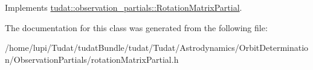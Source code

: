 Implements \hyperlink{classtudat_1_1observation__partials_1_1RotationMatrixPartial_a758db711ec18f3efbaa759488e45daf1}{tudat\+::observation\+\_\+partials\+::\+Rotation\+Matrix\+Partial}.



The documentation for this class was generated from the following file\+:\begin{DoxyCompactItemize}
\item 
/home/lupi/\+Tudat/tudat\+Bundle/tudat/\+Tudat/\+Astrodynamics/\+Orbit\+Determination/\+Observation\+Partials/rotation\+Matrix\+Partial.\+h\end{DoxyCompactItemize}
